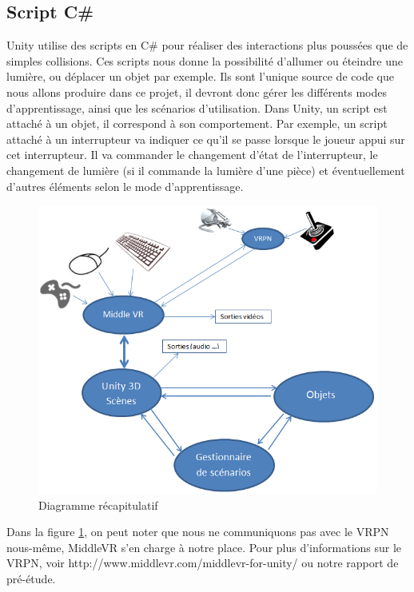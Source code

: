 \subsection{Script C\#}
Unity utilise des scripts en C\# pour réaliser des interactions plus poussées que de simples collisions. Ces scripts nous donne la possibilité d'allumer ou éteindre une lumière, ou déplacer un objet par exemple. Ils sont l'unique source de code que nous allons produire dans ce projet, il devront donc gérer les différents modes d'apprentissage, ainsi que les scénarios d'utilisation.
Dans Unity, un script est attaché à un objet, il correspond à son comportement. Par exemple, un script attaché à un interrupteur va indiquer ce qu'il se passe lorsque le joueur appui sur cet interrupteur. Il va commander le changement d'état de l'interrupteur, le changement de lumière (si il commande la lumière d'une pièce) et éventuellement d'autres éléments selon le mode d'apprentissage.
\begin{figure}[h]
\centering
\includegraphics[width=1\textwidth]{4-conception/img/recap.png}
\caption{ Diagramme récapitulatif }
\label{recap}
\end{figure}

Dans la figure \ref{recap}, on peut noter que nous ne communiquons pas avec le VRPN nous-même, MiddleVR s'en charge à notre place. Pour plus d'informations sur le VRPN, voir http://www.middlevr.com/middlevr-for-unity/ ou notre rapport de pré-étude.